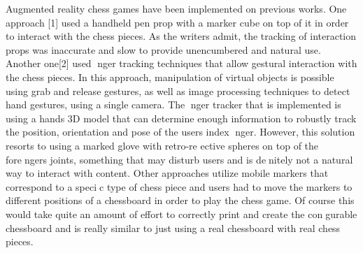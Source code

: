 Augmented reality chess games have been implemented on previous works. One approach
[1] used a handheld pen prop with a marker cube on top of it in order to interact with the
chess pieces. As the writers admit, the tracking of interaction props was inaccurate and slow
to provide unencumbered and natural use. Another one[2] used nger tracking techniques that
allow gestural interaction with the chess pieces. In this approach, manipulation of virtual objects
is possible using grab and release gestures, as well as image processing techniques to detect hand
gestures, using a single camera. The nger tracker that is implemented is using a hands 3D
model that can determine enough information to robustly track the position, orientation and
pose of the users index nger. However, this solution resorts to using a marked glove with
retro-re
ective spheres on top of the forengers joints, something that may disturb users and is
denitely not a natural way to interact with content. Other approaches utilize mobile markers
that correspond to a specic type of chess piece and users had to move the markers to different
positions of a chessboard in order to play the chess game. Of course this would take quite an
amount of effort to correctly print and create the congurable chessboard and is really similar
to just using a real chessboard with real chess pieces.


